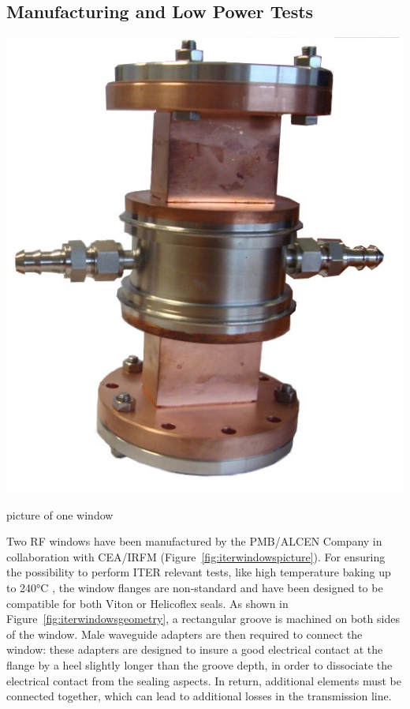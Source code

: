 \subsection{Manufacturing and Low Power Tests}\label{sec:ITER_windows_manuf_low_power_tests}
\begin{marginfigure}
	\centering
	\includegraphics[width=1.0\linewidth]{figures/chap3/ITER_window/ITER_windows_picture}
	\caption{picture of one window}
	\label{fig:iterwindowspicture}
\end{marginfigure}
Two RF windows have been manufactured by the PMB/ALCEN Company in collaboration with CEA/IRFM (Figure~\ref{fig:iterwindowspicture}). For ensuring the possibility to perform ITER relevant tests, like high temperature baking up to 240$\si{\degreeCelsius}$ , the window flanges are non-standard and have been designed to be compatible for both Viton or Helicoflex seals. As shown in Figure~\ref{fig:iterwindowsgeometry}, a rectangular groove is machined on both sides of the window. Male waveguide adapters are then required to connect the window: these adapters are designed to insure a good electrical contact at the flange by a heel slightly longer than the groove depth, in order to dissociate the electrical contact from the sealing aspects. In return, additional elements must be connected together, which can lead to additional losses in the transmission line.   

